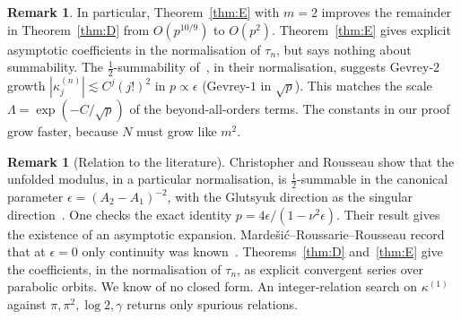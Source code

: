 \documentclass[11pt]{amsart}
\theoremstyle{definition}
\newtheorem{remark}[theorem]{Remark}
\begin{document}
\begin{remark}
In particular, Theorem~\ref{thm:E} with $m=2$ improves the remainder in
Theorem~\ref{thm:D} from $O(p^{10/9})$ to $O(p^2)$.
Theorem~\ref{thm:E} gives explicit asymptotic coefficients in the normalisation
of $\tau_n$, but says nothing about summability.  The
$\tfrac12$-summability of~\cite{ChristopherRousseau}, in their normalisation,
suggests Gevrey-$2$ growth $|\kappa^{(n)}_j|\lesssim C^j(j!)^2$ in $p\propto\epsilon$
(Gevrey-$1$ in $\sqrt p$).  This matches the scale $\Lambda=\exp(-C/\sqrt p)$ of the
beyond-all-orders terms.
The constants in our proof grow faster, because $N$ must grow like $m^2$.
\end{remark}

\begin{remark}[Relation to the literature]
Christopher and Rousseau show that the unfolded modulus, in a particular
normalisation, is $\tfrac12$-summable in the canonical parameter
$\epsilon=(A_2-A_1)^{-2}$, with the Glutsyuk direction as the singular
direction~\cite[Cor.~4.9]{ChristopherRousseau}.  One checks the exact identity
$p=4\epsilon/(1-\nu^2\epsilon)$.  Their result gives the existence of an
asymptotic expansion.  Marde\v{s}i\'c--Roussarie--Rousseau record that at
$\epsilon=0$ only continuity was known~\cite[\S11]{MRR2004}.
Theorems~\ref{thm:D} and~\ref{thm:E} give the coefficients, in the
normalisation of $\tau_n$, as explicit convergent series over parabolic orbits.  We know of no
closed form.  An integer-relation search on $\kappa^{(1)}$ against
$\pi,\pi^2,\log2,\gamma$ returns only spurious relations.
\end{remark}
\end{document}

